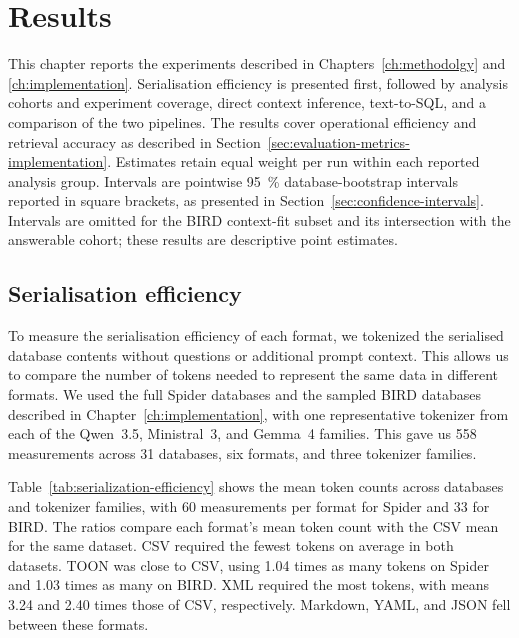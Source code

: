 \chapter{Results} \label{ch:results}

This chapter reports the experiments described in Chapters~\ref{ch:methodolgy} and \ref{ch:implementation}.
Serialisation efficiency is presented first, followed by analysis cohorts and experiment coverage, direct
context inference, text-to-SQL, and a comparison of the two pipelines. The results cover operational
efficiency and retrieval accuracy as described in Section~\ref{sec:evaluation-metrics-implementation}.
Estimates retain equal weight per run within each reported analysis group. Intervals are pointwise
\qty{95}{\percent} database-bootstrap intervals reported in square brackets, as presented in
Section~\ref{sec:confidence-intervals}. Intervals are omitted for the BIRD context-fit
subset and its intersection with the answerable cohort; these results are descriptive point estimates.

\section{Serialisation efficiency} \label{sec:serialization-results}



To measure the serialisation efficiency of each format, we tokenized the serialised database contents without
questions or additional prompt context. This allows us to compare the number of tokens needed to represent
the same data in different formats. We used the full Spider databases and the sampled BIRD databases
described in Chapter~\ref{ch:implementation}, with one representative tokenizer from each of the Qwen~3.5,
Ministral~3, and Gemma~4 families. This gave us \num{558} measurements across \num{31} databases, six
formats, and three tokenizer families.

Table~\ref{tab:serialization-efficiency} shows the mean token counts across databases and tokenizer families,
with \num{60} measurements per format for Spider and \num{33} for BIRD. The ratios compare each format's mean
token count with the CSV mean for the same dataset. CSV required the fewest tokens on average in both
datasets. TOON was close to CSV, using \num{1.04} times as many tokens on Spider and \num{1.03} times as many
on BIRD. XML required the most tokens, with means \num{3.24} and \num{2.40} times those of CSV, respectively.
Markdown, YAML, and JSON fell between these formats.

